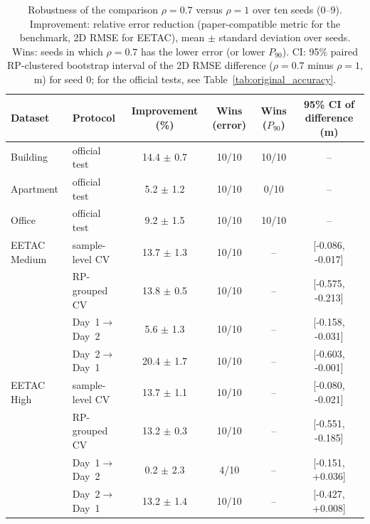 \begin{table}[!t]
\centering
\caption{Robustness of the comparison $\rho=0.7$ versus $\rho=1$ over ten seeds (0--9). Improvement: relative error reduction (paper-compatible metric for the benchmark, 2D RMSE for EETAC), mean $\pm$ standard deviation over seeds. Wins: seeds in which $\rho=0.7$ has the lower error (or lower $P_{90}$). CI: 95\% paired RP-clustered bootstrap interval of the 2D RMSE difference ($\rho=0.7$ minus $\rho=1$, m) for seed 0; for the official tests, see Table~\ref{tab:original_accuracy}.}
\label{tab:robustness}
\footnotesize
\setlength{\tabcolsep}{4pt}
\begin{tabular}{llcccc}
\toprule
Dataset & Protocol & Improvement (\%) & Wins (error) & Wins ($P_{90}$) & 95\% CI of difference (m) \\
\midrule
Building & official test & 14.4 $\pm$ 0.7 & 10/10 & 10/10 & -- \\
Apartment & official test & 5.2 $\pm$ 1.2 & 10/10 & 0/10 & -- \\
Office & official test & 9.2 $\pm$ 1.5 & 10/10 & 10/10 & -- \\
\midrule
EETAC Medium & sample-level CV & 13.7 $\pm$ 1.3 & 10/10 & -- & [-0.086, -0.017] \\
 & RP-grouped CV & 13.8 $\pm$ 0.5 & 10/10 & -- & [-0.575, -0.213] \\
 & Day~1$\rightarrow$Day~2 & 5.6 $\pm$ 1.3 & 10/10 & -- & [-0.158, -0.031] \\
 & Day~2$\rightarrow$Day~1 & 20.4 $\pm$ 1.7 & 10/10 & -- & [-0.603, -0.001] \\
EETAC High & sample-level CV & 13.7 $\pm$ 1.1 & 10/10 & -- & [-0.080, -0.021] \\
 & RP-grouped CV & 13.2 $\pm$ 0.3 & 10/10 & -- & [-0.551, -0.185] \\
 & Day~1$\rightarrow$Day~2 & 0.2 $\pm$ 2.3 & 4/10 & -- & [-0.151, +0.036] \\
 & Day~2$\rightarrow$Day~1 & 13.2 $\pm$ 1.4 & 10/10 & -- & [-0.427, +0.008] \\
\bottomrule
\end{tabular}
\end{table}
